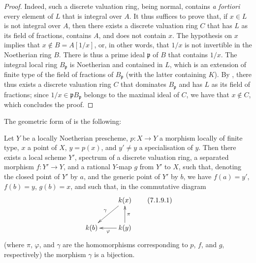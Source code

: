 \begin{proof}
\label{proof-II.7.1.8}
Indeed, such a discrete valuation ring, being normal, contains \emph{a fortiori} every element of $L$ that is integral over $A$.
It thus suffices to prove that, if $x\in L$ is not integral over $A$, then there exists a discrete valuation ring $C$ that has $L$ as its field of fractions, contains $A$, and does not contain $x$.
The hypothesis on $x$ implies that $x\not\in B=A[1/x]$, or, in other words, that $1/x$ is not invertible in the Noetherian ring $B$.
There is thus a prime ideal $\mathfrak{p}$ of $B$ that contains $1/x$.
The integral local ring $B_\mathfrak{p}$ is Noetherian and contained in $L$, which is an extension  of finite type of the field of fractions of $B_\mathfrak{p}$ (with the latter containing $K$).
By , there thus exists a discrete valuation ring $C$ that dominates $B_\mathfrak{p}$ and has $L$ as its field of fractions;
since $1/x\in\mathfrak{p}B_\mathfrak{p}$ belongs to the maximal ideal of $C$, we have that $x\not\in C$, which concludes the proof.
\end{proof}

The geometric form of  is the following:

\begin{proposition}[7.1.9]
\label{II.7.1.9}
Let $Y$ be a locally Noetherian prescheme, $p:X\to Y$ a morphism locally of finite type, $x$ a point of $X$, $y=p(x)$, and $y'\neq y$ a specialisation of $y$.
Then there exists a local scheme $Y'$, spectrum of a discrete valuation ring, a separated morphism $f:Y'\to Y$, and a rational $Y$-map $g$ from $Y'$ to $X$, such that, denoting the closed point of $Y'$ by $a$, and the generic point of $Y'$ by $b$, we have $f(a)=y'$, $f(b)=y$, $g(b)=x$, and such that, in the commutative diagram
\[
\label{II.7.1.9.1}
    \xymatrix{
        & \kres(x) \ar[dl]_{\gamma}
    \\  \kres(b)
        & \kres(y) \ar[u]_{\pi} \ar[l]^{\varphi}
    }
\tag{7.1.9.1}
\]
(where $\pi$, $\varphi$, and $\gamma$ are the homomorphisms corresponding to $p$, $f$, and $g$, respectively) the morphism $\gamma$ is a bijection.
\end{proposition}

